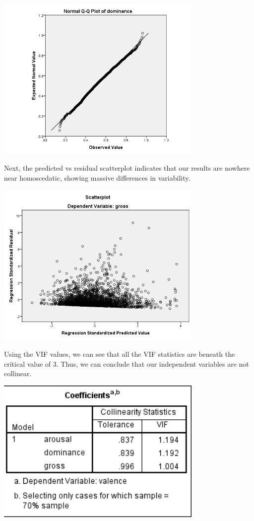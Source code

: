 \documentclass[font=10pt]{article}
\begin{document}
\begin{center}
	\includegraphics[width=10cm]{dominanceqq}
\end{center}

Next, the predicted vs residual scatterplot indicates that our results are nowhere near homoscedatic, showing massive differences in variability.

\begin{center}
	\includegraphics[width=10cm]{homoscedasticy}
\end{center}
Using the VIF values, we can see that all the VIF statistics are beneath the critical value of 3. Thus, we can conclude that our independent variables are not collinear.

\begin{center}
	\includegraphics[width=10cm]{vif}
\end{center}
\end{document}

